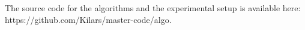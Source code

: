 The source code for the algorithms and the experimental setup is available here:\\ https://github.com/Kilars/master-code/algo.

